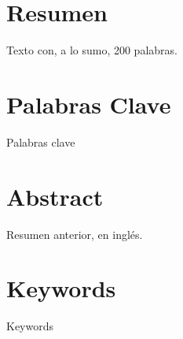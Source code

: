 \vspace*{-2.5cm}
\section*{Resumen}
\label{sec:resumen}

Texto con, a lo sumo, 200 palabras.

\lipsum[1]


\vfill
\vfill
\section*{Palabras Clave}
\label{sec:palabra_clave}

Palabras clave
\vfill
\vfill


\clearpage

\vspace*{-2.5cm}
\section*{Abstract}
\label{sec:abstract}
Resumen anterior, en inglés.

\lipsum[1]


\vfill
\vfill
\section*{Keywords}
\label{sec:keywords}
Keywords
\vfill
\vfill